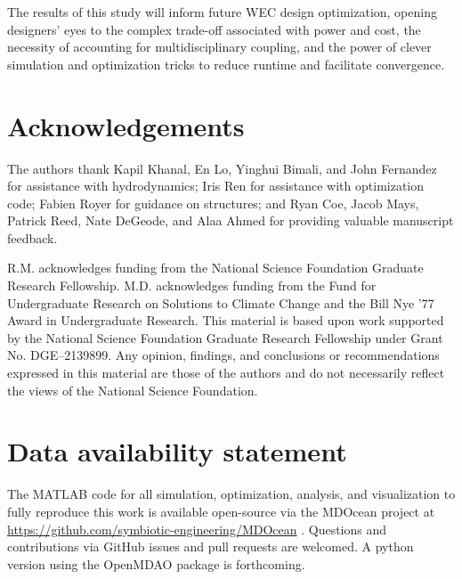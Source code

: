 \documentclass[preprint,12pt]{elsarticle}
\begin{document}
The results of this study will inform future WEC design optimization, opening designers' eyes to the complex trade-off associated with power and cost, the necessity of accounting for multidisciplinary coupling, and the power of clever simulation and optimization tricks to reduce runtime and facilitate convergence.

\section{Acknowledgements}
The authors thank Kapil Khanal, En Lo, Yinghui Bimali, and John Fernandez for assistance with hydrodynamics; Iris Ren for assistance with optimization code; Fabien Royer for guidance on structures; and Ryan Coe, Jacob Mays, Patrick Reed, Nate DeGeode, and Alaa Ahmed for providing valuable manuscript feedback.

R.M. acknowledges funding from the National Science Foundation Graduate Research Fellowship.
M.D. acknowledges funding from the Fund for Undergraduate Research on Solutions to Climate Change and the Bill Nye ’77 Award in Undergraduate Research.
This material is based upon work supported by the National Science Foundation Graduate Research Fellowship under Grant No.
DGE–2139899.
Any opinion, findings, and conclusions or recommendations expressed in this material are those of the authors and do not necessarily reflect the views of the National Science Foundation.

\section{Data availability statement}
The MATLAB code for all simulation, optimization, analysis, and visualization to fully reproduce this work is available open-source via the MDOcean project at \url{https://github.com/symbiotic-engineering/MDOcean} \cite{mccabe_mdocean_2024}.
Questions and contributions via GitHub issues and pull requests are welcomed.
A python version using the OpenMDAO package is forthcoming. %




\end{document}
